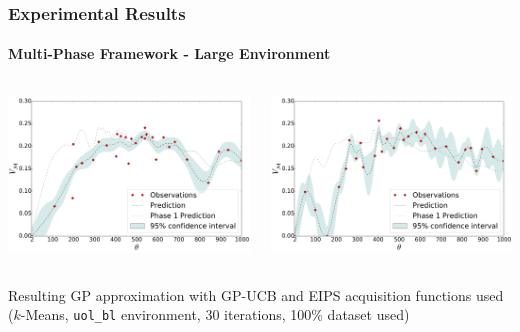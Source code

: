 \begin{frame}
	\frametitle{Experimental Results}
	\framesubtitle{Multi-Phase Framework - Large Environment}
	\vspace{10pt}
	\begin{columns}
		\begin{column}{0.5\textwidth}
			\includegraphics[width=\linewidth]{../../figures/plots/uol_multi/plot_b_00__alg_kmeans_pct_100_acq_ei.pdf}
		\end{column}
		\begin{column}{0.5\textwidth}
			\includegraphics[width=\linewidth]{../../figures/plots/uol_multi/plot_b_00__alg_kmeans_pct_100_acq_ucb.pdf}
		\end{column}
	\end{columns}
	\begin{center}
		\footnotesize
		Resulting GP approximation with GP-UCB and EIPS acquisition functions used\\
		($k$-Means, \texttt{uol\_bl} environment, 30 iterations, 100\% dataset used)
	\end{center}
\end{frame}